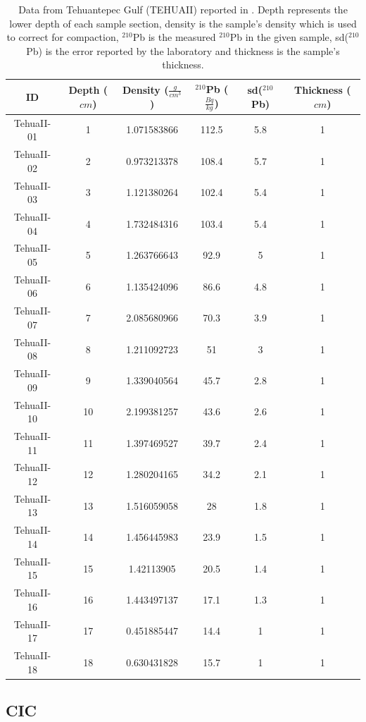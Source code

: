 \documentclass [10pt] {article}
\begin{document}
\begin{table}
\centering
    \begin{tabular}{|c| c| c| c| c| c|}
\hline
	    ID  & Depth ($cm$)  & Density ($\frac{g}{cm^3}$)  & $^{210}$Pb ($\frac{Bq}{kg}$) & sd($^{210}$Pb)  & Thickness ($cm$) \\
\hline
TehuaII-01  & 1  & 1.071583866  & 112.5  & 5.8  & 1\\
TehuaII-02  & 2  & 0.973213378  & 108.4  & 5.7  & 1\\
TehuaII-03  & 3  & 1.121380264  & 102.4  & 5.4  & 1\\
TehuaII-04  & 4  & 1.732484316  & 103.4  & 5.4  & 1\\
TehuaII-05  & 5  & 1.263766643  & 92.9  & 5  & 1\\
TehuaII-06  & 6  & 1.135424096  & 86.6  & 4.8  & 1\\
TehuaII-07  & 7  & 2.085680966  & 70.3  & 3.9  & 1\\
TehuaII-08  & 8  & 1.211092723  & 51  & 3  & 1\\
TehuaII-09  & 9  & 1.339040564  & 45.7  & 2.8  & 1\\
TehuaII-10  & 10  & 2.199381257  & 43.6  & 2.6  & 1\\
TehuaII-11  & 11  & 1.397469527  & 39.7  & 2.4  & 1\\
TehuaII-12  & 12  & 1.280204165  & 34.2  & 2.1  & 1\\
TehuaII-13  & 13  & 1.516059058  & 28  & 1.8  & 1\\
TehuaII-14  & 14  & 1.456445983  & 23.9  & 1.5  & 1\\
TehuaII-15  & 15  & 1.42113905  & 20.5  & 1.4  & 1\\
\hline
\dotfill
TehuaII-16  & 16  & 1.443497137  & 17.1  & 1.3  & 1\\
TehuaII-17  & 17  & 0.451885447  & 14.4  & 1  & 1\\
TehuaII-18  & 18  & 0.630431828  & 15.7  & 1  & 1\\
\hline
    \end{tabular}
	\caption{Data from Tehuantepec Gulf (TEHUAII) reported in \citet{Sanchez-Cabeza2012}. Depth represents the lower depth of each sample section, density is the sample's density which is used to correct for compaction, $^{210}$Pb is the measured $^{210}$Pb in the given sample, sd($^{210}$Pb) is the error reported by the laboratory and thickness is the sample's thickness.  }
	\label{tab:tehuaii}
\end{table}


\subsection{CIC}
\end{document}
